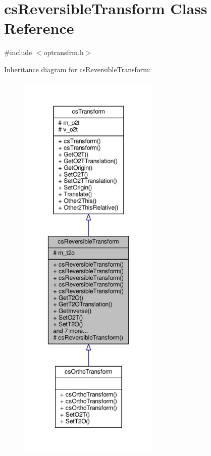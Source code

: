 \hypertarget{classcsReversibleTransform}{}\section{cs\+Reversible\+Transform Class Reference}
\label{classcsReversibleTransform}


{\ttfamily \#include $<$optransfrm.\+h$>$}



Inheritance diagram for cs\+Reversible\+Transform\+:
\nopagebreak
\begin{figure}[H]
\begin{center}
\leavevmode
\includegraphics[height=550pt]{d0/d1f/classcsReversibleTransform__inherit__graph}
\end{center}
\end{figure}


